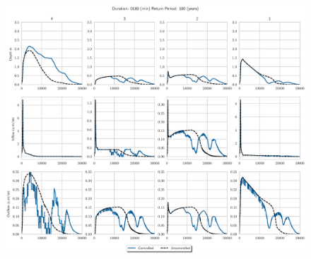 \begin{figure}
    \centering
    \includegraphics[width=\linewidth]{./RL-SI-figures/77storms/0180100.eps}
\end{figure}



